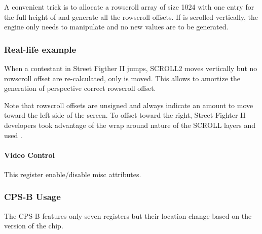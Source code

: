A convenient trick is to allocate a rowscroll array of size 1024 with one entry for the full height of  and generate all the rowscroll offsets. If  is scrolled vertically, the engine only needs to manipulate  and no new values are to be generated.

 

\subsubsection{Real-life example}

When a contestant in Street Figther II jumps, SCROLL2 moves vertically but no rowscroll offset are re-calculated, only   is moved. This allows to amortize the generation of perspective correct rowscroll offset.

Note that rowscroll offsets are unsigned and always indicate an amount to move toward the left side of the screen. To offset toward the right, Street Fighter II developers took advantage of the wrap around nature of the SCROLL layers and used .




\paragraph{Video Control} This register enable/disable misc attributes.

 

\label{cpsbreg_programming}
\subsubsection{CPS-B Usage}
The CPS-B features only seven registers but their location change based on the version of the chip.

